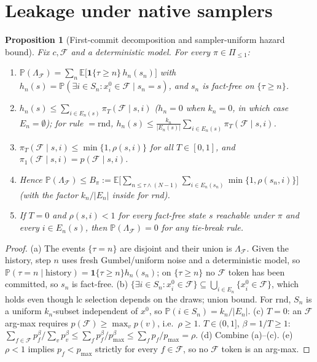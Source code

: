\documentclass[11pt]{article}
\newtheorem{proposition}{Proposition}
\newcommand{\F}{\mathcal{F}}
\newcommand{\E}{\mathbb{E}}
\newcommand{\Prob}{\mathbb{P}}
\begin{document}
\section{Leakage under native samplers}
\begin{proposition}[First-commit decomposition and sampler-uniform hazard bound]\label{prop:hazard}
Fix $c,\F$ and a deterministic model. For every $\pi\in\Pi_{\le1}$:
\begin{enumerate}
\item[(a)] $\Prob(\Lambda_\F)=\sum_{n}\E\big[\mathbf{1}\{\tau\ge n\}\,h_n(s_n)\big]$ with $h_n(s)=\Prob(\exists i\in S_n: x^0_i\in\F\mid s_n=s)$,
and $s_n$ is fact-free on $\{\tau\ge n\}$.
\item[(b)] $h_n(s)\le\sum_{i\in E_n(s)}\pi_T(\F\mid s,i)$ ($h_n=0$ when $k_n=0$, in which case $E_n=\emptyset$); for rule $=\mathrm{rnd}$, $h_n(s)\le\frac{k_n}{|E_n(s)|}\sum_{i\in E_n(s)}\pi_T(\F\mid s,i)$.
\item[(c)] $\pi_T(\F\mid s,i)\le\min\{1,\rho(s,i)\}$ for all $T\in[0,1]$, and $\pi_1(\F\mid s,i)=p(\F\mid s,i)$.
\item[(d)] Hence $\Prob(\Lambda_\F)\le B_\pi:=\E\big[\sum_{n\le\tau\wedge(N-1)}\sum_{i\in E_n(s_n)}\min\{1,\rho(s_n,i)\}\big]$
(with the factor $k_n/|E_n|$ inside for rnd).
\item[(e)] If $T=0$ and $\rho(s,i)<1$ for every fact-free state $s$ reachable under $\pi$ and every $i\in E_n(s)$, then
$\Prob(\Lambda_\F)=0$ for any tie-break rule.
\end{enumerate}
\end{proposition}
\begin{proof}
(a) The events $\{\tau=n\}$ are disjoint and their union is $\Lambda_\F$. Given the history, step $n$ uses fresh
Gumbel/uniform noise and a deterministic model, so $\Prob(\tau=n\mid\text{history})=\mathbf{1}\{\tau\ge n\}h_n(s_n)$;
on $\{\tau\ge n\}$ no $\F$ token has been committed, so $s_n$ is fact-free.
(b) $\{\exists i\in S_n:x^0_i\in\F\}\subseteq\bigcup_{i\in E_n}\{x^0_i\in\F\}$, which holds even though lc selection depends on the draws;
union bound. For rnd, $S_n$ is a uniform $k_n$-subset independent of $x^0$, so $\Prob(i\in S_n)=k_n/|E_n|$.
(c) $T=0$: an $\F$ arg-max requires $p(\F)\ge\max_v p(v)$, i.e.\ $\rho\ge1$. $T\in(0,1]$, $\beta=1/T\ge1$:
$\sum_{f\in\F}p_f^\beta/\sum_v p_v^\beta\le\sum_f p_f^\beta/p_{\max}^\beta\le\sum_f p_f/p_{\max}=\rho$.
(d) Combine (a)--(c). (e) $\rho<1$ implies $p_f<p_{\max}$ strictly for every $f\in\F$, so no $\F$ token is an arg-max.
\end{proof}
\end{document}
